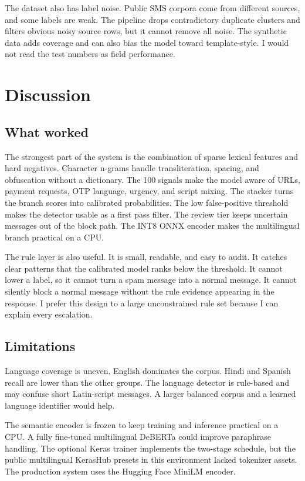 \documentclass[11pt]{article}
\begin{document}
The dataset also has label noise. Public SMS corpora come from different sources, and some labels are weak. The pipeline drops contradictory duplicate clusters and filters obvious noisy source rows, but it cannot remove all noise. The synthetic data adds coverage and can also bias the model toward template-style. I would not read the test numbers as field performance.

\section{Discussion}

\subsection{What worked}

The strongest part of the system is the combination of sparse lexical features and hard negatives. Character n-grams handle transliteration, spacing, and obfuscation without a dictionary. The 100 signals make the model aware of URLs, payment requests, OTP language, urgency, and script mixing. The stacker turns the branch scores into calibrated probabilities. The low false-positive threshold makes the detector usable as a first pass filter. The review tier keeps uncertain messages out of the block path. The INT8 ONNX encoder makes the multilingual branch practical on a CPU.

The rule layer is also useful. It is small, readable, and easy to audit. It catches clear patterns that the calibrated model ranks below the threshold. It cannot lower a label, so it cannot turn a spam message into a normal message. It cannot silently block a normal message without the rule evidence appearing in the response. I prefer this design to a large unconstrained rule set because I can explain every escalation.

\subsection{Limitations}

Language coverage is uneven. English dominates the corpus. Hindi and Spanish recall are lower than the other groups. The language detector is rule-based and may confuse short Latin-script messages. A larger balanced corpus and a learned language identifier would help.

The semantic encoder is frozen to keep training and inference practical on a CPU. A fully fine-tuned multilingual DeBERTa could improve paraphrase handling. The optional Keras trainer implements the two-stage schedule, but the public multilingual KerasHub presets in this environment lacked tokenizer assets. The production system uses the Hugging Face MiniLM encoder.
\end{document}
